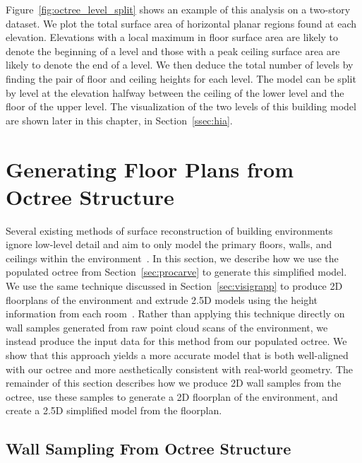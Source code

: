 \documentclass[12pt,onecolumn,oneside]{book}
\begin{document}
Figure~\ref{fig:octree_level_split} shows an example of this analysis on a two-story dataset.  We plot the total surface area of horizontal planar regions found at each elevation.  Elevations with a local maximum in floor surface area are likely to denote the beginning of a level and those with a peak ceiling surface area are likely to denote the end of a level.  We then deduce the total number of levels by finding the pair of floor and ceiling heights for each level.  The model can be split by level at the elevation halfway between the ceiling of the lower level and the floor of the upper level.  The visualization of the two levels of this building model are shown later in this chapter, in Section~\ref{ssec:hia}.

\section{Generating Floor Plans from Octree Structure}
\label{sec:oct2fp}

Several existing methods of surface reconstruction of building environments ignore low-level detail and aim to only model the primary floors, walls, and ceilings within the environment~\cite{Okorn09,Weiss05,Nuchter03,Castles07,Mura13,BasicPlaneFit,Victors,Xiong13,WallFinder,Mura14,Cabral14,Lafarge13,Museums,Oesau13}.  In this section, we describe how we use the populated octree from Section~\ref{sec:procarve} to generate this simplified model.  We use the same technique discussed in Section~\ref{sec:visigrapp} to produce 2D floorplans of the environment and extrude 2.5D models using the height information from each room~\cite{Turner14}.  Rather than applying this technique directly on wall samples generated from raw point cloud scans of the environment, we instead produce the input data for this method from our populated octree.  We show that this approach yields a more accurate model that is both well-aligned with our octree and more aesthetically consistent with real-world geometry.  The remainder of this section describes how we produce 2D wall samples from the octree, use these samples to generate a 2D floorplan of the environment, and create a 2.5D simplified model from the floorplan.

\subsection{Wall Sampling From Octree Structure}
\label{ssec:oct2dq}
\end{document}
